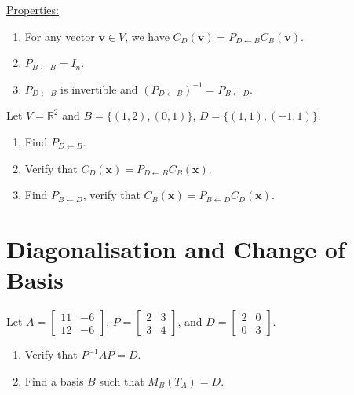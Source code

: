 \documentclass[20pt,a4paper]{extarticle}
\newcounter{example}
\begin{document}
\underline{Properties:}
	\begin{enumerate}[label=\Circled{\arabic*}]
		\item For any vector $\mathbf{v} \in V$, we have $C_D (\mathbf{v}) = P_{D \leftarrow B} C_B (\mathbf{v})$.
		\item $P_{B \leftarrow B} = I_n$.
		\item $P_{D \leftarrow B}$ is invertible and $(P_{D \leftarrow B})^{-1} = P_{B \leftarrow D}$.
	\end{enumerate}

\newpage 


\begin{example}
Let $V = \mathbb{R}^2$ and $B = \{ (1, 2), (0, 1) \}$, $D = \{ (1, 1) , (-1, 1) \}$. 
	\begin{enumerate}[label=\alph*)]
	\item Find $P_{D \leftarrow B}$.
	\item Verify that $C_D (\mathbf{x}) = P_{D \leftarrow B} C_B (\mathbf{x})$. 
	\item Find $P_{B \leftarrow D}$, verify that $C_B (\mathbf{x}) = P_{B \leftarrow D} C_D (\mathbf{x})$.
	\end{enumerate}
\end{example}

\begin{solution}

\end{solution}

\newpage 

\phantom{2}

\newpage 

\section{Diagonalisation and Change of Basis}

\begin{example}
Let $A = \begin{bmatrix} 11 & -6 \\ 12 & -6 \end{bmatrix}$, $P = \begin{bmatrix} 2 & 3 \\ 3 & 4 \end{bmatrix}$, and $D = \begin{bmatrix} 2 & 0 \\ 0 & 3 \end{bmatrix}$.
	\begin{enumerate}[label=\alph*)]
		\item Verify that $P^{-1} A P = D$.
		\item Find a basis $B$ such that $M_B (T_A) = D$.
	\end{enumerate}
\end{example}
\end{document}
